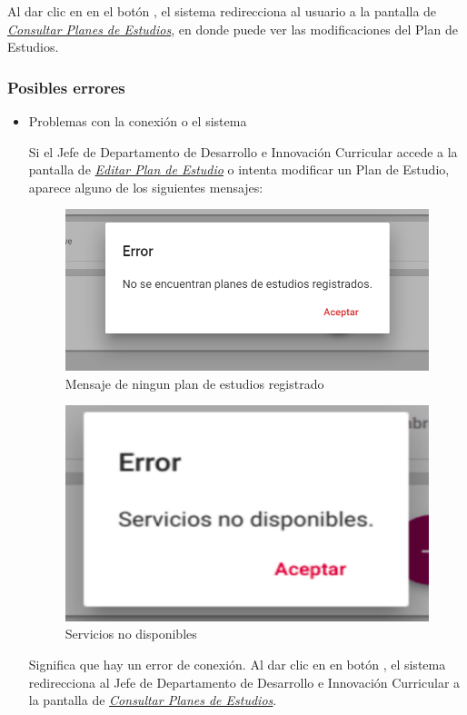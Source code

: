 Al dar clic en en el botón  , el sistema redirecciona al usuario a la pantalla de \hyperlink{consultarPE}{\textit{Consultar Planes de Estudios}}, en donde puede ver las modificaciones del Plan de Estudios.\\
\newpage
\subsubsection{Posibles errores}

\begin{itemize}
	\item Problemas con la conexión o el sistema

	Si el Jefe de Departamento de Desarrollo e Innovación Curricular accede a la pantalla de \hyperlink{editarPE}{\textit{Editar Plan de Estudio}} o intenta modificar un Plan de Estudio, aparece alguno de los siguientes mensajes:

	\begin{figure}[H]
		\centering
		\hypertarget{ms3}{\includegraphics[width=0.7\linewidth]{images/SP4-GPE/m3}}
		\caption{Mensaje de ningun plan de estudios registrado}
		\label{ms3}
	\end{figure}
	\begin{figure}[H]
		\centering
		\hypertarget{error}{\includegraphics[width=0.7\linewidth]{images/SP4-GPE/error}}
		\caption{Servicios no disponibles}
		\label{error}
	\end{figure}


	Significa que hay un error de conexión. Al dar clic en en botón  , el sistema redirecciona al Jefe de Departamento de Desarrollo e Innovación Curricular a la pantalla de \hyperlink{consultarPE}{\textit{Consultar Planes de Estudios}}.
	\newpage


\end{itemize}
